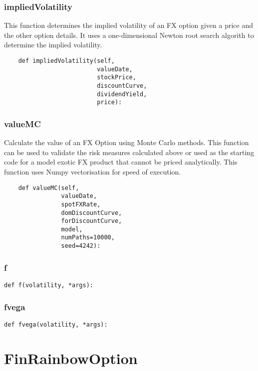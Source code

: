 \documentclass[twoside,11pt]{book}
\begin{document}
\subsubsection*{{\bf impliedVolatility}}
This function determines the implied volatility of an FX option given a price and the other option details. It uses a one-dimensional Newton root search algorith to determine the implied volatility.  

\begin{lstlisting}
    def impliedVolatility(self,
                          valueDate,
                          stockPrice,
                          discountCurve,
                          dividendYield,
                          price):
\end{lstlisting}

\subsubsection*{{\bf valueMC}}
Calculate the value of an FX Option using Monte Carlo methods. This function can be used to validate the risk measures calculated above or used as the starting code for a model exotic FX product that cannot be priced analytically. This function uses Numpy vectorisation for speed of execution. 

\begin{lstlisting}
    def valueMC(self,
                valueDate,
                spotFXRate,
                domDiscountCurve,
                forDiscountCurve,
                model,
                numPaths=10000,
                seed=4242):
\end{lstlisting}

\subsubsection*{{\bf f}}


\begin{lstlisting}
def f(volatility, *args):
\end{lstlisting}

\subsubsection*{{\bf fvega}}


\begin{lstlisting}
def fvega(volatility, *args):
\end{lstlisting}

\newpage
\section{FinRainbowOption}
\end{document}
